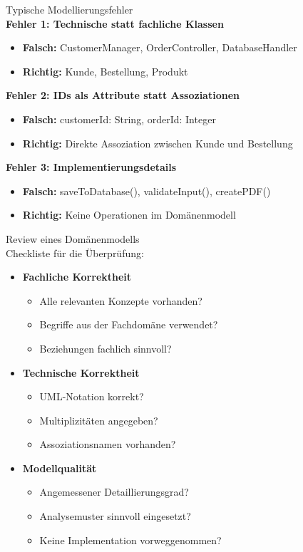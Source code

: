 \begin{corollary}{Typische Modellierungsfehler}\\
\textbf{Fehler 1: Technische statt fachliche Klassen}
\begin{itemize}
    \item \textbf{Falsch:} CustomerManager, OrderController, DatabaseHandler
    \item \textbf{Richtig:} Kunde, Bestellung, Produkt
\end{itemize}

\textbf{Fehler 2: IDs als Attribute statt Assoziationen}
\begin{itemize}
    \item \textbf{Falsch:} customerId: String, orderId: Integer
    \item \textbf{Richtig:} Direkte Assoziation zwischen Kunde und Bestellung
\end{itemize}

\textbf{Fehler 3: Implementierungsdetails}
\begin{itemize}
    \item \textbf{Falsch:} saveToDatabase(), validateInput(), createPDF()
    \item \textbf{Richtig:} Keine Operationen im Domänenmodell
\end{itemize}
\end{corollary}


\begin{KR}{Review eines Domänenmodells}\\
Checkliste für die Überprüfung:
\begin{itemize}
    \item \textbf{Fachliche Korrektheit}
    \begin{itemize}
        \item Alle relevanten Konzepte vorhanden?
        \item Begriffe aus der Fachdomäne verwendet?
        \item Beziehungen fachlich sinnvoll?
    \end{itemize}
    
    \item \textbf{Technische Korrektheit}
    \begin{itemize}
        \item UML-Notation korrekt?
        \item Multiplizitäten angegeben?
        \item Assoziationsnamen vorhanden?
    \end{itemize}
    
    \item \textbf{Modellqualität}
    \begin{itemize}
        \item Angemessener Detaillierungsgrad?
        \item Analysemuster sinnvoll eingesetzt?
        \item Keine Implementation vorweggenommen?
    \end{itemize}
\end{itemize}
\end{KR}

